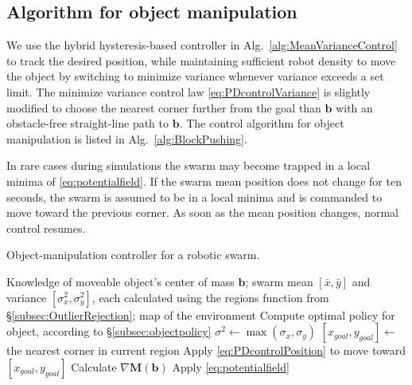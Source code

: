 \subsection{Algorithm for object manipulation}
 We use the hybrid hysteresis-based controller in Alg.~\ref{alg:MeanVarianceControl}  to track the desired position, while maintaining sufficient robot density to move the object by switching to minimize variance whenever variance exceeds a set limit. The minimize variance control law \eqref{eq:PDcontrolVariance} is slightly modified to choose the nearest corner further from the goal than $\mathbf{b}$ with an obstacle-free straight-line path to $\mathbf{b}$. 
The control algorithm  for object manipulation is listed in Alg.~\ref{alg:BlockPushing}. 

In rare cases during simulations the swarm may become trapped in a local minima of \eqref{eq:potentialfield}.
If the swarm mean position does not change for ten seconds, the swarm is assumed to be in a local minima and is commanded to move toward the previous corner. As soon as the mean position changes, normal control resumes.



\begin{algorithm}
\caption{Object-manipulation controller for a robotic swarm.}\label{alg:BlockPushing}
\begin{algorithmic}[1]
\Require Knowledge of moveable object's center of mass $\mathbf{b}$; swarm mean $[\bar{x},\bar{y}]$ and variance $[\sigma_x^2, \sigma_y^2]$, each calculated using the regions function from \S \ref{subsec:OutlierRejection};  map of the environment
\State Compute optimal policy for object, according to \S \ref{subsec:objectpolicy}
\State $\sigma^2 \gets \max{(\sigma_x,\sigma_y)}$
\State $ [x_{goal}, y_{goal}] \gets $ the nearest corner in current region
\State Apply \eqref{eq:PDcontrolPosition} to move toward $[x_{goal}, y_{goal}]$
\EndWhile
\Else  
\State Calculate $\nabla \mathbf{M}(\mathbf{b})$  
\State Apply \eqref{eq:potentialfield}   
\EndIf
\EndWhile
\end{algorithmic}
\end{algorithm}


